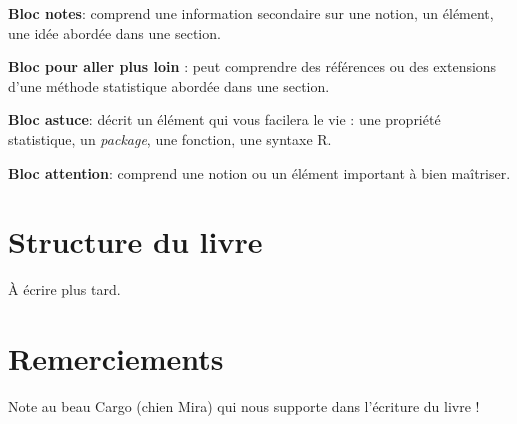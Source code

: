 \documentclass[
  11pt,
  french,
]{book}
\makeatletter
\newenvironment{kframev}{%
\medskip{}
\setlength{\fboxsep}{.8em}
 \def\at@end@of@kframev{}%
 \ifinner\ifhmode%
  \def\at@end@of@kframev{\end{minipage}}%
  \begin{minipage}{\columnwidth}%
 \fi\fi%
 \def\FrameCommand##1{\hskip\@totalleftmargin \hskip-\fboxsep
 \colorbox{shadebluecolor}{##1}\hskip-\fboxsep
     \hskip-\linewidth \hskip-\@totalleftmargin \hskip\columnwidth}%
 \MakeFramed {\advance\hsize-\width
   \@totalleftmargin\z@ \linewidth\hsize
   \@setminipage}}%
 {\par\unskip\endMakeFramed%
 \at@end@of@kframev}
\newenvironment{rmdblock}[1]
  {
  \begin{itemize}
  \renewcommand{\labelitemi}{
    \raisebox{-.7\height}[0pt][0pt]{
      {\setkeys{Gin}{width=3em,keepaspectratio}\texttt{[image: images/\#1]}}
    }
  }
  \setlength{\fboxsep}{1em}
  \begin{kframev}
  \small
  \item
  }
  {
  \end{kframev}
  \end{itemize}
  }
\newenvironment{bloc_notes}
  {\begin{rmdblock}{notes}}
  {\end{rmdblock}}
\newenvironment{bloc_aller_loin}
  {\begin{rmdblock}{aller_loin}}
  {\end{rmdblock}}
\newenvironment{bloc_astuce}
  {\begin{rmdblock}{astuce}}
  {\end{rmdblock}}
\newenvironment{bloc_attention}
  {\begin{rmdblock}{attention}}
  {\end{rmdblock}}
\makeatother
\begin{document}
\begin{bloc_notes}

\textbf{Bloc notes}: comprend une information secondaire sur une notion, un élément, une idée abordée dans une section.

\end{bloc_notes}

\begin{bloc_aller_loin}

\textbf{Bloc pour aller plus loin} : peut comprendre des références ou des extensions d'une méthode statistique abordée dans une section.

\end{bloc_aller_loin}

\begin{bloc_astuce}

\textbf{Bloc astuce}: décrit un élément qui vous facilera le vie : une propriété statistique, un \emph{package}, une fonction, une syntaxe R.

\end{bloc_astuce}

\begin{bloc_attention}

\textbf{Bloc attention}: comprend une notion ou un élément important à bien maîtriser.

\end{bloc_attention}

\hypertarget{structure-du-livre}{%
\section*{Structure du livre}\label{structure-du-livre}}

À écrire plus tard.

\hypertarget{remerciements}{%
\section*{Remerciements}\label{remerciements}}

Note au beau Cargo (chien Mira) qui nous supporte dans l'écriture du livre !
\end{document}
